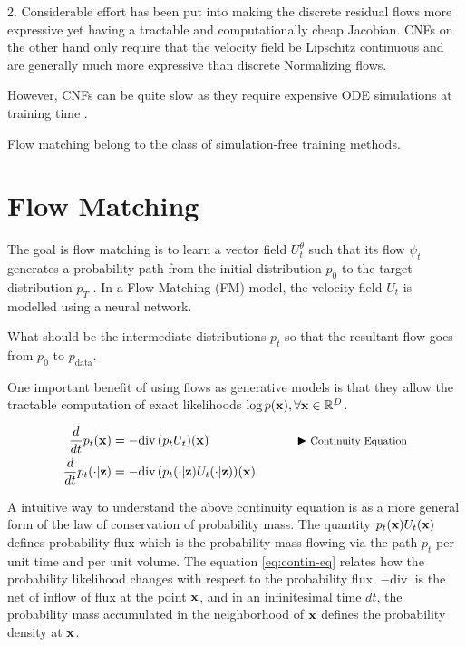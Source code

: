 \documentclass[a4paper, 11pt]{article}
\begin{document}
2. Considerable effort has been put into making the discrete residual flows more expressive yet having a tractable and computationally cheap Jacobian. CNFs on the other hand only require that the velocity field be Lipschitz continuous and are generally much more expressive than discrete Normalizing flows.

However, CNFs can be quite slow as they require expensive ODE simulations at training time \citep{mathieu2024flow}. 

Flow matching belong to the class of simulation-free training methods.

\section{Flow Matching}
The goal is flow matching is to learn a vector field $U_t^{\theta}$ such that its flow $\psi_t$ generates a probability path from the initial distribution $p_0$ to the target distribution $p_T$ \citep{lipman2024flow}. In a Flow Matching (FM) model, the velocity field $U_t$ is modelled using a neural network.

What should be the intermediate distributions $p_t$ so that the resultant flow goes from $p_0$ to $p_{\text{data}}$.

\begin{Takeaway}{}{}
    One important benefit of using flows as generative models is that they allow the tractable computation of exact likelihoods $\log p(\mbox{$\mbox{$\mathbf{x}$}$}), \forall \mbox{$\mbox{$\mathbf{x}$}$} \in \mathbb{R}^D$.
\end{Takeaway}


\begin{align}
    \frac{d}{dt} p_t(\mbox{$\mbox{$\mathbf{x}$}$}) &= - \text{div}\, (p_t U_t)(\mbox{$\mbox{$\mathbf{x}$}$}) && \qquad \blacktriangleright\text{\footnotesize Continuity Equation} \label{eq:contin-eq}\\ 
    \frac{d}{dt} p_t(\cdot | \mbox{$\mbox{$\mathbf{z}$}$}) &= - \text{div}\, (p_t(\cdot |\mbox{$\mbox{$\mathbf{z}$}$}) U_t(\cdot |\mbox{$\mbox{$\mathbf{z}$}$}))(\mbox{$\mbox{$\mathbf{x}$}$}) \label{eq:contin-cond-eq}
\end{align}

A intuitive way to understand the above continuity equation is as a more general form of the law of conservation of probability mass. The quantity $p_t(\mbox{$\mbox{$\mathbf{x}$}$})U_t(\mbox{$\mbox{$\mathbf{x}$}$})$ defines probability flux which is the probability mass flowing via the path $p_t$ per unit time and per unit volume. The equation \eqref{eq:contin-eq} relates how the probability likelihood changes with respect to the probability flux. $- \text{div}\,$ is the net of inflow of flux at the point $\mbox{$\mbox{$\mathbf{x}$}$}$, and in an infinitesimal time $dt$, the probability mass accumulated in the neighborhood of $\mbox{$\mbox{$\mathbf{x}$}$}$ defines the probability density at $\mbox{$\mbox{$\mathbf{x}$}$}$.
 
\end{document}
